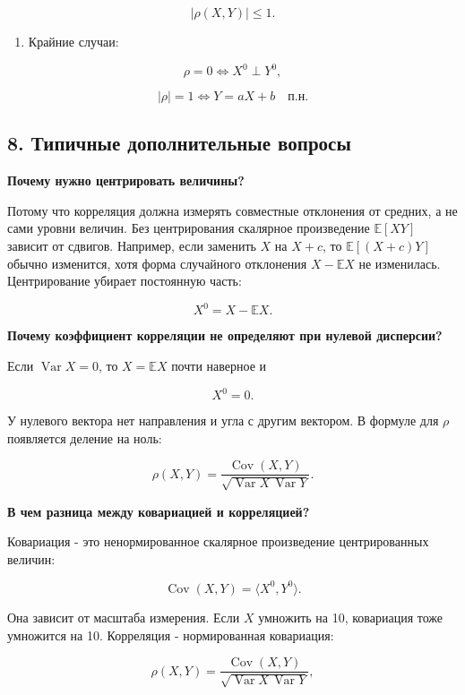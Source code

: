 \documentclass[
  11pt,
  a4paper,
]{article}
\providecommand{\tightlist}{%
  \setlength{\itemsep}{0pt}\setlength{\parskip}{0pt}}
\begin{document}
\[
|\rho(X,Y)|\le1.
\]

\begin{enumerate}
\def\labelenumi{\arabic{enumi}.}
\setcounter{enumi}{5}
\tightlist
\item
  Крайние случаи:
\end{enumerate}

\[
\rho=0 \Longleftrightarrow X^0\perp Y^0,
\]

\[
|\rho|=1 \Longleftrightarrow Y=aX+b\quad\text{п.н.}
\]

\subsection{8. Типичные дополнительные
вопросы}\label{ux442ux438ux43fux438ux447ux43dux44bux435-ux434ux43eux43fux43eux43bux43dux438ux442ux435ux43bux44cux43dux44bux435-ux432ux43eux43fux440ux43eux441ux44b}

\textbf{Почему нужно центрировать величины?}

Потому что корреляция должна измерять совместные отклонения от средних,
а не сами уровни величин. Без центрирования скалярное произведение
\(\mathbb E[XY]\) зависит от сдвигов. Например, если заменить \(X\) на
\(X+c\), то \(\mathbb E[(X+c)Y]\) обычно изменится, хотя форма
случайного отклонения \(X-\mathbb EX\) не изменилась. Центрирование
убирает постоянную часть:

\[
X^0=X-\mathbb EX.
\]

\textbf{Почему коэффициент корреляции не определяют при нулевой
дисперсии?}

Если \(\operatorname{Var}X=0\), то \(X=\mathbb EX\) почти наверное и

\[
X^0=0.
\]

У нулевого вектора нет направления и угла с другим вектором. В формуле
для \(\rho\) появляется деление на ноль:

\[
\rho(X,Y)=
\frac{\operatorname{Cov}(X,Y)}
{\sqrt{\operatorname{Var}X\,\operatorname{Var}Y}}.
\]

\textbf{В чем разница между ковариацией и корреляцией?}

Ковариация - это ненормированное скалярное произведение центрированных
величин:

\[
\operatorname{Cov}(X,Y)=\langle X^0,Y^0\rangle.
\]

Она зависит от масштаба измерения. Если \(X\) умножить на 10, ковариация
тоже умножится на 10. Корреляция - нормированная ковариация:

\[
\rho(X,Y)=
\frac{\operatorname{Cov}(X,Y)}
{\sqrt{\operatorname{Var}X\,\operatorname{Var}Y}},
\]
\end{document}
